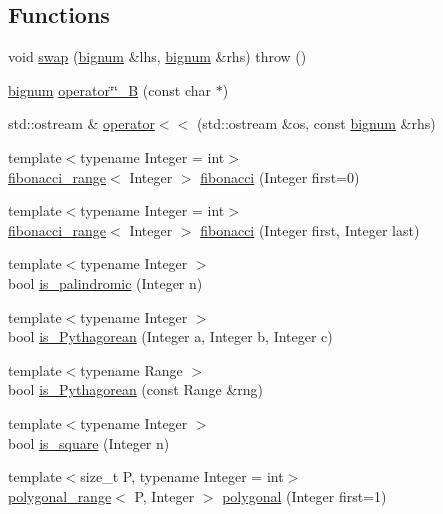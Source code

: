 \subsection*{\-Functions}
\begin{DoxyCompactItemize}
\item 
void \hyperlink{namespaceyuh_aa193df2583649f98adcb61639763872d}{swap} (\hyperlink{classyuh_1_1bignum}{bignum} \&lhs, \hyperlink{classyuh_1_1bignum}{bignum} \&rhs)  throw ()
\item 
\hyperlink{classyuh_1_1bignum}{bignum} \hyperlink{namespaceyuh_aa5ca9c97a6e2f8461ef346724d9f4a3c}{operator\char`\"{}\char`\"{}\-\_\-\-B} (const char $\ast$)
\item 
std\-::ostream \& \hyperlink{namespaceyuh_a1fe067954dcd4572b8d2472b8457814d}{operator$<$$<$} (std\-::ostream \&os, const \hyperlink{classyuh_1_1bignum}{bignum} \&rhs)
\item 
{\footnotesize template$<$typename Integer  = int$>$ }\\\hyperlink{classyuh_1_1fibonacci__range}{fibonacci\-\_\-range}$<$ \-Integer $>$ \hyperlink{namespaceyuh_a11988532f81d143e1b5b74d461dd8067}{fibonacci} (\-Integer first=0)
\item 
{\footnotesize template$<$typename Integer  = int$>$ }\\\hyperlink{classyuh_1_1fibonacci__range}{fibonacci\-\_\-range}$<$ \-Integer $>$ \hyperlink{namespaceyuh_a17b1d33879798b95bdefe171df90380a}{fibonacci} (\-Integer first, \-Integer last)
\item 
{\footnotesize template$<$typename Integer $>$ }\\bool \hyperlink{namespaceyuh_afc7f4ca69e0d8cb035be348d77d2a33e}{is\-\_\-palindromic} (\-Integer n)
\item 
{\footnotesize template$<$typename Integer $>$ }\\bool \hyperlink{namespaceyuh_a14298c4b76f1a9d0537e7d5d67cfa784}{is\-\_\-\-Pythagorean} (\-Integer a, \-Integer b, \-Integer c)
\item 
{\footnotesize template$<$typename Range $>$ }\\bool \hyperlink{namespaceyuh_af94deeef5a14f79a6a51c6ca3155d03e}{is\-\_\-\-Pythagorean} (const \-Range \&rng)
\item 
{\footnotesize template$<$typename Integer $>$ }\\bool \hyperlink{namespaceyuh_a43d71ed08fec121213f4ad3acbdc4d26}{is\-\_\-square} (\-Integer n)
\item 
{\footnotesize template$<$size\-\_\-t \-P, typename Integer  = int$>$ }\\\hyperlink{classyuh_1_1polygonal__range}{polygonal\-\_\-range}$<$ \-P, \-Integer $>$ \hyperlink{namespaceyuh_ac79b05fba2817ead4f0b5fd4c5a5a805}{polygonal} (\-Integer first=1)

\end{DoxyCompactItemize}
